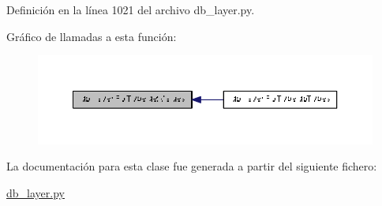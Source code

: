 Definición en la línea 1021 del archivo db\-\_\-layer.\-py.



Gráfico de llamadas a esta función\-:\nopagebreak
\begin{figure}[H]
\begin{center}
\leavevmode
\includegraphics[width=350pt]{classdb__layer_1_1_rol_type_ac5bb27c22700d45efbcc4c70008bf132_icgraph}
\end{center}
\end{figure}




La documentación para esta clase fue generada a partir del siguiente fichero\-:\begin{DoxyCompactItemize}
\item 
\hyperlink{db__layer_8py}{db\-\_\-layer.\-py}\end{DoxyCompactItemize}
